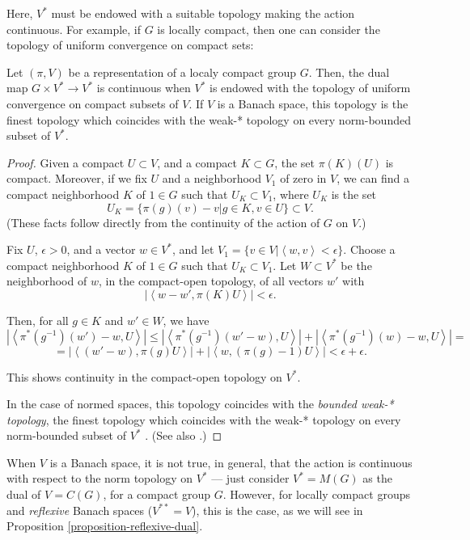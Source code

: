 Here, $V^*$ must be endowed with a suitable topology making the action continuous. For example, if $G$ is locally compact, then one can consider the topology of uniform convergence on compact sets:

\begin{lemma}
\label{lemma-topology-dual}
 Let $(\pi, V)$ be a representation of a localy compact group $G$. Then, the dual map $G\times V^*\to V^*$ is continuous when $V^*$ is endowed with the topology of uniform convergence on compact subsets of $V$. If $V$ is a Banach space, this topology is the finest topology which coincides with the weak-* topology on every norm-bounded subset of $V^*$.
\end{lemma}

\begin{proof}
 Given a compact $U\subset V$, and a compact $K\subset G$, the set $\pi(K)(U)$ is compact. Moreover, 
if we fix $U$ and a neighborhood $V_1$ of zero in $V$, we can find a compact neighborhood $K$ of $1\in G$ such that $U_K\subset V_1$, where $U_K$ is the set
 $$U_K=\{\pi(g)(v)-v| g\in K, v\in U\}\subset V.$$
(These facts follow directly from the continuity of the action of $G$ on $V$.)
 
 Fix $U$, $\epsilon>0$, and a vector $w\in V^*$, and let $V_1 = \{ v\in V| \left < w, v\right> <\epsilon\}$. Choose a compact neighborhood $K$ of $1\in G$ such that $U_K\subset V_1$. Let $W\subset V^*$ be the neighborhood of $w$, in the compact-open topology, of all vectors $w'$ with
 $$ |\left < w-w', \pi(K)U\right>|<\epsilon.$$
 
 Then, for all $g\in K$ and $w'\in W$, we have 
 $$ | \left < \pi^*(g^{-1}) (w')-w, U\right> | \le |\left < \pi^*(g^{-1}) (w'-w), U\right> | + | \left < \pi^*(g^{-1}) (w)-w, U\right> | =$$
 $$ = |\left < (w'-w), \pi(g) U\right> | + | \left < w, (\pi(g) - 1) U\right> | < \epsilon + \epsilon.$$

This shows continuity in the compact-open topology on $V^*$.

In the case of normed spaces, this topology coincides with the \emph{bounded weak-* topology}, the finest topology which coincides with the weak-* topology on every norm-bounded subset of $V^*$ \cite[\S II.5, Lemma 2]{Day}. (See also \cite[\S 2.7 and 3.4]{Megginson}.)
\end{proof}



When $V$ is a Banach space, it is not true, in general, that the action is continuous with respect to the norm topology on $V^*$ --- just consider $V^*=M(G)$ as the dual of $V=C(G)$, for a compact group $G$. However, for locally compact groups and \emph{reflexive} Banach spaces ($V^{**}=V$), this is the case, as we will see in Proposition \ref{proposition-reflexive-dual}.



